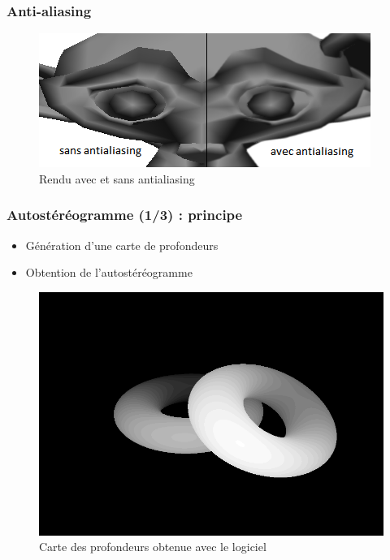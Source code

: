 \documentclass{beamer}
\begin{document}

\begin{frame}
\frametitle{Anti-aliasing}
\begin{figure}
\centering
\includegraphics[scale=0.8]{antialiasing.png}
\caption{Rendu avec et sans antialiasing}
\end{figure}

\end{frame}


%
\begin{frame}
\frametitle{Autostéréogramme (1/3) : principe}

\begin{itemize}[label=$\bullet$]
\item Génération d'une carte de profondeurs
\item Obtention de l'autostéréogramme
\end{itemize}

\begin{figure}
\centering
\includegraphics[scale=0.22]{donutdepth.png}
\caption{Carte des profondeurs obtenue avec le logiciel}
\end{figure}
\end{frame}
\end{document}

